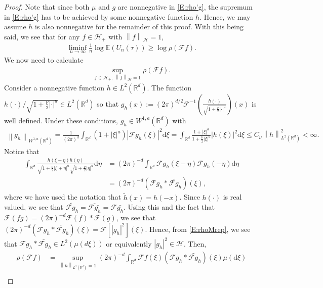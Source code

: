 \documentclass[12pt]{report}
\theoremstyle{plain}
\theoremstyle{definition}
\numberwithin{equation}{section}
\newcommand{\R}{\mathbb{R}}
\newcommand{\Norm}[1]{\left\|  #1   \right\|}
\newcommand{\ud}{\ensuremath{ \mathrm{d} }}
\begin{document}
\begin{proof}
	Note that since both $\mu$ and $g$ are nonnegative in \eqref{E:rho'g}, the supremum in
	\eqref{E:rho'g} has to be achieved by some nonnegative function $h$. Hence, we may assume $h$ is
	also nonnegative for the remainder of this proof. With this being said, we see that for any $f \in
	\mathcal{H}_+$ with $\Norm{f}_\mathcal{H} =1$,
	\begin{align*}
	\liminf_{n \to \infty} \frac{1}{n}\log \mathbb{E}(U_n(\tau)) \ge \log \rho(\mathcal{F}f).
	\end{align*}
	We now need to calculate
	\begin{align*}
	\sup_{f \in \mathcal{H}_+, \: \Norm{f}_{\mathcal{H}}=1} \rho\left(\mathcal{F}f\right).
	\end{align*}
	Consider a nonnegative function $h\in L^2(\R^d)$. The function
	$h(\cdot)/\sqrt{1+\frac{\nu}{2}|\cdot|^a} \in L^2(\R^d)$ so that $g_h(x) := (2\pi)^{d/2}
	\mathcal{F}^{-1}\left( \frac{h(\cdot)}{\sqrt{1+\frac{\nu}{2}|\cdot|^a}} \right)(x)$ is well
	defined. Under these conditions, $g_h \in W^{1,a}(\R^d)$ with
	\begin{align*}
	\Norm{g_h}_{W^{1,a}(\R^d)} = \frac{1}{(2\pi)^d} \int_{\R^d} (1+|\xi|^a) |\mathcal{F}g_h(\xi)|^2\ud\xi
	= \int_{\R^d} \frac{1+|\xi|^a}{1+\frac{\nu}{2}|\xi|^a} |h(\xi)|^2 \ud \xi
	\le C_\nu \Norm{h}_{L^2(\R^d)}^2 <\infty.
	\end{align*}
	Notice that
	\begin{align*}
	\int_{\R^d} \frac{h(\xi +
		\eta)h(\eta)}{\sqrt{1+\frac{\nu}{2}|\xi+\eta|^a}\sqrt{1+\frac{\nu}{2}|\eta|^a}}  \ud \eta
	& = (2\pi)^{-d}\int_{\R^d} \mathcal{F}g_h(\xi-\eta)\mathcal{F}g_h(-\eta) \ud \eta \\
	& =(2\pi)^{-d} (\mathcal{F}g_h*\widetilde{\mathcal{F}g_h})(\xi),
	\end{align*}
	where we have used the notation that $\widetilde{h}(x) = h(-x)$.  Since $h(\cdot)$ is real valued,
	we see that $\widetilde{\mathcal{F}g_h} = \overline{\mathcal{F}\bar{g_h}}= \mathcal{F}\bar{g_h} $.
	Using this and the fact that $\mathcal{F}(fg) = (2\pi)^{-d}\mathcal{F}(f)*\mathcal{F}(g)$, we see
	that $(2\pi)^{-d}(\mathcal{F}g_h*\widetilde{\mathcal{F}g_h})(\xi)
	=\mathcal{F}\left[|g_h|^2\right](\xi)$. Hence, from \eqref{E:rhoMrep}, we see that $\mathcal{F}g_h
	* \widetilde{\mathcal{F}g_h}\in L^2\left(\mu(d\xi)\right)$ or equivalently $|g_h|^2\in \mathcal{H}$.
	Then,
	\begin{align*}
	\rho(\mathcal{F}f) & = \sup_{\Norm{h}_{L^2(\R^d)}=1}(2\pi)^{-d} \int_{\R^d}\mathcal{F}f(\xi)(\mathcal{F}g_h*\widetilde{\mathcal{F}g_h})(\xi) \mu(\ud \xi) \\

\end{align*}
\end{proof}
\end{document}

